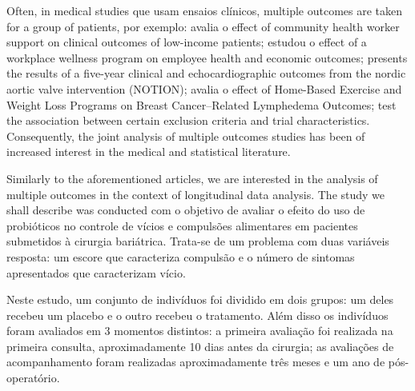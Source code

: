 \documentclass[AMA,STIX1COL]{WileyNJD-v2}
\begin{document}

Often, in medical studies que usam ensaios clínicos, multiple outcomes are taken for a group of patients, por exemplo: \cite{kangovi2018effect} avalia o effect of community health worker support on clinical outcomes of low-income patients; \cite{song2019effect} estudou o effect of a workplace wellness program on employee health and economic outcomes; \cite{thyregod2019five} presents the results of a five-year clinical and echocardiographic outcomes from the nordic aortic valve intervention (NOTION); \cite{schmitz2019effect} avalia o effect of Home-Based Exercise and Weight Loss Programs on Breast Cancer–Related Lymphedema Outcomes; \cite{duma2019characterization} test the association between certain exclusion criteria and trial characteristics. Consequently, the joint analysis of multiple outcomes studies has been of increased interest in the medical and statistical literature. 


Similarly to the aforementioned articles, we are interested in the analysis of multiple outcomes in the context of longitudinal data analysis. The study we shall describe was conducted com o objetivo de avaliar o efeito do uso de probióticos no controle de vícios e compulsões alimentares em pacientes submetidos à cirurgia bariátrica. Trata-se de um problema com duas variáveis resposta: um escore que caracteriza compulsão e o número de sintomas apresentados que caracterizam vício. 

Neste estudo, um conjunto de indivíduos foi dividido em dois grupos: um deles recebeu um placebo e o outro recebeu o tratamento. Além disso os indivíduos foram avaliados em 3 momentos distintos: a primeira avaliação foi realizada na primeira consulta, aproximadamente 10 dias antes da cirurgia; as avaliações de acompanhamento foram realizadas aproximadamente três meses e um ano de pós-operatório.

\end{document}
